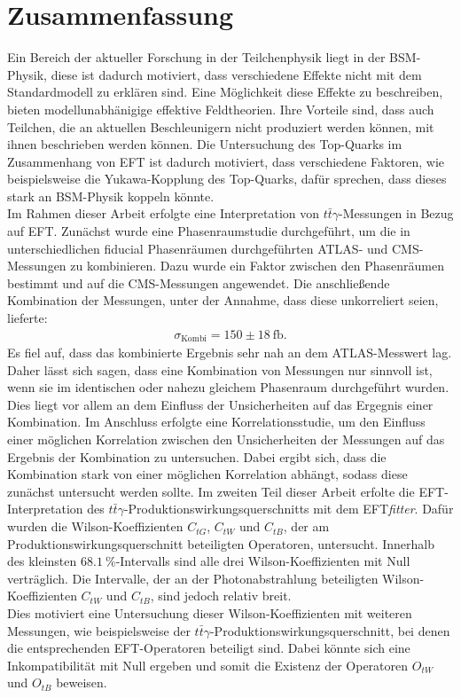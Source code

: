 \chapter{Zusammenfassung}
Ein Bereich der aktueller Forschung in der Teilchenphysik liegt in der BSM-Physik, diese ist dadurch motiviert, dass verschiedene Effekte nicht mit dem Standardmodell zu erklären sind. Eine Möglichkeit diese Effekte zu beschreiben, bieten modellunabhänigige effektive Feldtheorien. Ihre Vorteile sind, dass auch Teilchen, die an aktuellen Beschleunigern nicht produziert werden können, mit ihnen beschrieben werden können. Die Untersuchung des Top-Quarks im Zusammenhang von EFT ist dadurch motiviert, dass verschiedene Faktoren, wie beispielsweise die Yukawa-Kopplung des Top-Quarks, dafür sprechen, dass dieses stark an BSM-Physik koppeln könnte. \\
Im Rahmen dieser Arbeit erfolgte eine Interpretation von $t\bar{t}\gamma$-Messungen in Bezug auf EFT. Zunächst wurde eine Phasenraumstudie durchgeführt, um die in unterschiedlichen fiducial Phasenräumen durchgeführten ATLAS- und CMS-Messungen zu kombinieren. Dazu wurde ein Faktor zwischen den Phasenräumen bestimmt und auf die CMS-Messungen angewendet. Die anschließende Kombination der Messungen, unter der Annahme, dass diese unkorreliert seien, lieferte:
\begin{align*}
  \sigma_{\text{Kombi}} = 150 \pm 18~ \si{\femto\barn}.
\end{align*}
Es fiel auf, dass das kombinierte Ergebnis sehr nah an dem ATLAS-Messwert lag. Daher lässt sich sagen, dass eine Kombination von Messungen nur sinnvoll ist, wenn sie im identischen oder nahezu gleichem Phasenraum durchgeführt wurden. Dies liegt vor allem an dem Einfluss der Unsicherheiten auf das Ergegnis einer Kombination. Im Anschluss erfolgte eine Korrelationsstudie, um den Einfluss einer möglichen Korrelation zwischen den Unsicherheiten der Messungen auf das Ergebnis der Kombination zu untersuchen. Dabei ergibt sich, dass die Kombination stark von einer möglichen Korrelation abhängt, sodass diese zunächst untersucht werden sollte.
Im zweiten Teil dieser Arbeit erfolte die EFT-Interpretation des $t\bar{t}\gamma$-Produktionswirkungsquerschnitts mit dem EFT\textit{fitter}. Dafür wurden die Wilson-Koeffizienten $C_{tG}$, $C_{tW}$ und $C_{tB}$, der am Produktionswirkungsquerschnitt beteiligten Operatoren, untersucht. Innerhalb des kleinsten $\SI{68.1}{\percent}$-Intervalls sind alle drei Wilson-Koeffizienten mit Null verträglich. Die Intervalle, der an der Photonabstrahlung beteiligten Wilson-Koeffizienten $C_{tW}$ und $C_{tB}$, sind jedoch relativ breit.\\
Dies motiviert eine Untersuchung dieser Wilson-Koeffizienten mit weiteren Messungen, wie beispielsweise der $t\bar{t}\gamma$-Produktionswirkungsquerschnitt, bei denen die entsprechenden EFT-Operatoren beteiligt sind. Dabei könnte sich eine Inkompatibilität mit Null ergeben und somit die Existenz der Operatoren $O_{tW}$ und $O_{tB}$ beweisen.
